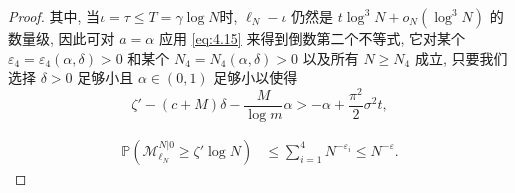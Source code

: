 \begin{proof}
{    }{
        其中, 当$\iota=\tau\le T=\gamma\log N$时, $\ell_N-\iota$ 仍然是 $t\log^3N+o_N(\log^3N)$ 的数量级, 因此可对 $a=\alpha$ 应用 \eqref{eq:4.15} 来得到倒数第二个不等式, 它对某个 $\varepsilon_4=\varepsilon_4(\alpha,\delta)>0$ 和某个 $N_4=N_4(\alpha,\delta)>0$ 以及所有 $N\ge N_4$ 成立, 只要我们选择 $\delta>0$ 足够小且 $\alpha\in(0,1)$ 足够小以使得
    }
    \begin{equation*}
        \zeta'-(c+M)\delta-\frac M{\log m}\alpha
        >
        -\alpha+\frac{\pi^2}2\sigma^2 t,
    \end{equation*}

    \begin{align*}
        \mathbb P\left(
            \mathcal M^{N|0}_{\ell_N}
            \ge
            \zeta'\log N
        \right)
        &
        \le
        \sum_{i=1}^4N^{-\varepsilon_i}
        \le
        N^{-\varepsilon}.
    \end{align*}
\end{proof}
